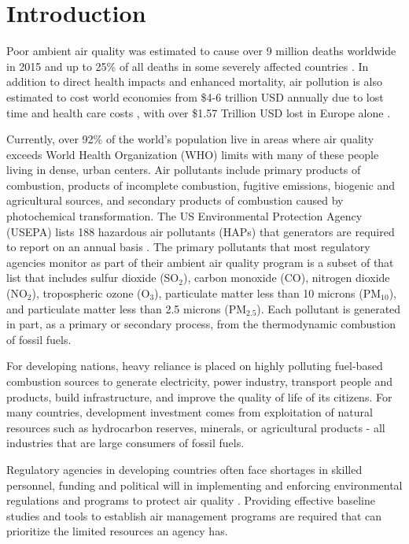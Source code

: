 \chapter{Introduction}

Poor ambient air quality was estimated to cause over 9 million deaths worldwide in 2015 and up to 25\% of all deaths in some severely affected countries \citep{Landrigan2017}. In addition to direct health impacts and enhanced mortality, air pollution is also estimated to cost world economies from \$4-6 trillion USD annually due to lost time and health care costs \citep{Landrigan2017, Narain2016}, with over \$1.57 Trillion USD lost in Europe alone \citep{Roy2015}.

Currently, over 92\% of the world's population live in areas where air quality exceeds World Health Organization (WHO) limits \citep{WHO2016} with many of these people living in dense, urban centers. Air pollutants include primary products of combustion, products of incomplete combustion, fugitive emissions, biogenic and agricultural sources, and secondary products of combustion caused by photochemical transformation. The US Environmental Protection Agency (USEPA) lists 188 hazardous air pollutants (HAPs) that generators are required to report on an annual basis \citep{USEPA1996}. The primary pollutants that most regulatory agencies monitor as part of their ambient air quality program is a subset of that list that includes sulfur dioxide (SO$_{2}$), carbon monoxide (CO), nitrogen dioxide (NO$_{2}$), tropospheric ozone (O$_{3}$),  particulate matter less than 10 microns (PM$_{10}$), and particulate matter less than 2.5 microns (PM$_{2.5}$). Each pollutant is generated in part, as a primary or secondary process, from the thermodynamic combustion of fossil fuels.

For developing nations, heavy reliance is placed on highly polluting fuel-based combustion sources to generate electricity, power industry, transport people and products, build infrastructure, and improve the quality of life of its citizens. For many countries, development investment comes from exploitation of natural resources such as hydrocarbon reserves, minerals, or agricultural products - all industries that are large consumers of fossil fuels.

Regulatory agencies in developing countries often face shortages in skilled personnel, funding and political will in implementing and enforcing environmental regulations and programs to protect air quality \citep{Freeman2015a}. Providing effective baseline studies and tools to establish air management programs are required that can prioritize the limited resources an agency has. 

